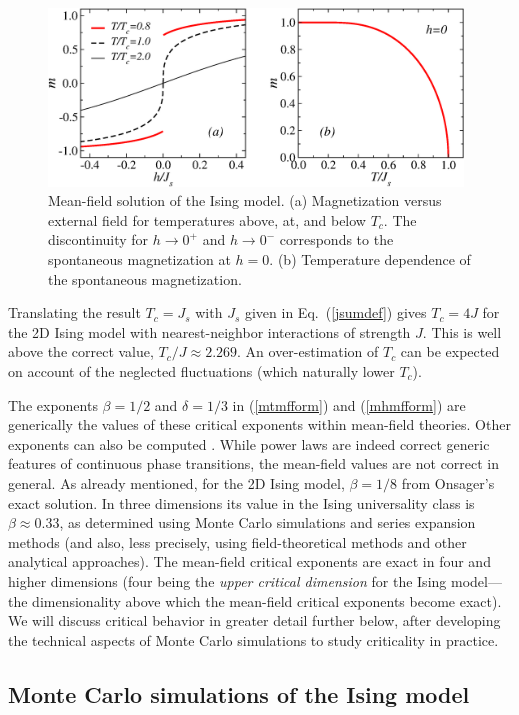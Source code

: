 \documentclass[draft,numberedheadings]{aipproc}
\begin{document}
\begin{figure}
\includegraphics[width=11cm, clip]{mfising.eps}
\caption{Mean-field solution of the Ising model. (a) Magnetization versus external field for temperatures above, at, and below $T_c$.
The discontinuity for $h\to 0^+$ and $h \to 0^-$ corresponds to the spontaneous magnetization at $h=0$. (b) Temperature dependence of the 
spontaneous magnetization.}
\label{mfising}
\end{figure}

Translating the result $T_c=J_s$ with $J_s$ given in Eq.~(\ref{jsumdef}) gives $T_c=4J$ for the 2D Ising model with nearest-neighbor 
interactions of strength $J$. This is well above the correct value, $T_c/J \approx 2.269$. An over-estimation of $T_c$ can be expected on account of the
neglected fluctuations (which naturally lower $T_c$).

The exponents $\beta=1/2$ and $\delta=1/3$ in (\ref{mtmfform}) and (\ref{mhmfform}) are generically the values of these critical exponents within mean-field 
theories. Other exponents can also be computed \cite{cardy}. While power laws are indeed correct generic features of continuous phase transitions, the mean-field 
values are not correct in general. As already mentioned, for the 2D Ising model, $\beta=1/8$ from Onsager's exact solution. In three dimensions its 
value in the Ising universality class is $\beta \approx 0.33$, as determined using Monte Carlo simulations and series expansion methods (and also, less precisely, 
using field-theoretical methods and other analytical approaches). The mean-field critical exponents are exact in four and higher dimensions (four being the 
{\it upper critical dimension} for the Ising model---the dimensionality above which the mean-field critical exponents become exact). We will discuss critical 
behavior in greater detail further below, after developing the technical aspects of Monte Carlo simulations to study criticality in practice.

\subsection{Monte Carlo simulations of the Ising model} 
\label{montecarlo}
\end{document}
